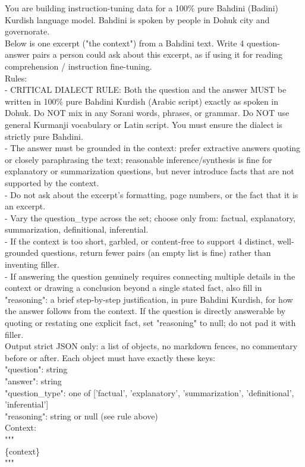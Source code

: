 \documentclass[10pt,a4paper]{article}
\begin{document}
\begin{corpuscard}
{\footnotesize\ttfamily{}
You are building instruction-tuning data for a 100\% pure Bahdini (Badini)
Kurdish language model. Bahdini is spoken by people in Dohuk city and
governorate.\\[0.5em]
Below is one excerpt ("the context") from a Bahdini text. Write 4
question-answer pairs a person could ask about this excerpt, as if using it for
reading comprehension / instruction fine-tuning.\\[0.5em]
Rules:\\
- CRITICAL DIALECT RULE: Both the question and the answer MUST be written in
100\% pure Bahdini Kurdish (Arabic script) exactly as spoken in Dohuk. Do NOT
mix in any Sorani words, phrases, or grammar. Do NOT use general Kurmanji
vocabulary or Latin script. You must ensure the dialect is strictly pure
Bahdini.\\
- The answer must be grounded in the context: prefer extractive answers quoting
or closely paraphrasing the text; reasonable inference/synthesis is fine for
explanatory or summarization questions, but never introduce facts that are not
supported by the context.\\
- Do not ask about the excerpt's formatting, page numbers, or the fact that it
is an excerpt.\\
- Vary the question\_type across the set; choose only from: factual,
explanatory, summarization, definitional, inferential.\\
- If the context is too short, garbled, or content-free to support 4 distinct,
well-grounded questions, return fewer pairs (an empty list is fine) rather than
inventing filler.\\
- If answering the question genuinely requires connecting multiple details in
the context or drawing a conclusion beyond a single stated fact, also fill in
"reasoning": a brief step-by-step justification, in pure Bahdini Kurdish, for
how the answer follows from the context. If the question is directly answerable
by quoting or restating one explicit fact, set "reasoning" to null; do not pad
it with filler.\\[0.5em]
Output strict JSON only: a list of objects, no markdown fences, no commentary
before or after. Each object must have exactly these keys:\\
\hspace*{2em}"question": string\\
\hspace*{2em}"answer": string\\
\hspace*{2em}"question\_type": one of ['factual', 'explanatory', 'summarization',
'definitional', 'inferential']\\
\hspace*{2em}"reasoning": string or null (see rule above)\\[0.5em]
Context:\\
"""\\
\{context\}\\
"""}
\end{corpuscard}
\end{document}
